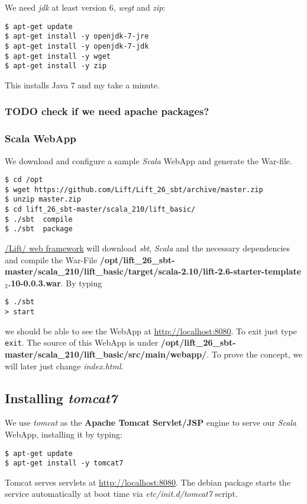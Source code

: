 \documentclass[11pt]{article}
\begin{document}
We need \emph{jdk} at least version 6, \emph{wegt} and \emph{zip}:

\begin{verbatim}
$ apt-get update
$ apt-get install -y openjdk-7-jre
$ apt-get install -y openjdk-7-jdk
$ apt-get install -y wget
$ apt-get install -y zip
\end{verbatim}
This installs Java 7 and my take a minute.
\subsubsection{\textbf{TODO} check if we need apache packages?}
\label{sec-3-1-2}
\subsubsection{Scala WebApp}
\label{sec-3-1-3}

We download and configure a sample \emph{Scala} WebApp and generate the War-file.

\begin{verbatim}
$ cd /opt
$ wget https://github.com/Lift/Lift_26_sbt/archive/master.zip
$ unzip master.zip
$ cd lift_26_sbt-master/scala_210/lift_basic/
$ ./sbt  compile
$ ./sbt  package
\end{verbatim}
\href{http:///Lift/web.net/getting_started}{/Lift/ web framework}  will download \emph{sbt}, \emph{Scala} and the necessary dependencies and compile the War-File \textbf{/opt/lift\_26\_sbt-master/scala\_210/lift\_basic/target/scala-2.10/lift-2.6-starter-template$_2$.10-0.0.3.war}. By typing

\begin{verbatim}
$ ./sbt 
> start
\end{verbatim}
we should be able to see the WebApp at \href{http://localhost:8080}{http://localhost:8080}. To exit just type \texttt{exit}. The source of this WebApp is under \textbf{/opt/lift\_26\_sbt-master/scala\_210/lift\_basic/src/main/webapp/}. To prove the concept, we will later just change \emph{index.html}.
\subsection{Installing \emph{tomcat7}}
\label{sec-3-2}

We use \emph{tomcat} as the \textbf{Apache Tomcat Servlet/JSP} engine to serve our \emph{Scala} WebApp, installing it by typing:

\begin{verbatim}
$ apt-get update
$ apt-get install -y tomcat7
\end{verbatim}
Tomcat serves servlets  at \href{http://localhost:8080}{http://localhost:8080}. The debian package starts the service automatically at boot time via \emph{etc/init.d/tomcat7} script.
\end{document}
